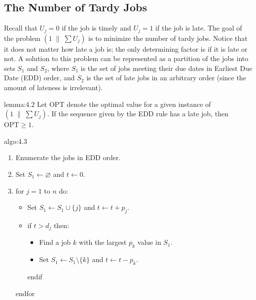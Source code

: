 
\subsection{The Number of Tardy Jobs} \label{subsec:4.2}
Recall that $U_j = 0$ if the job is timely and $U_j = 1$ if the job is late. 
The goal of the problem $(1\;\|\;\sum U_j)$ is to minimize the number of 
tardy jobs. Notice that it does not matter how late a job is; the only 
determining factor is if it is late or not. A solution to this problem can 
be represented as a partition of the jobs into sets $S_1$ and $S_2$, where 
$S_1$ is the set of jobs meeting their due dates in Earliest Due Date (EDD)
order, and $S_2$ is the set of late jobs in an arbitrary order (since the 
amount of lateness is irrelevant).  

\begin{lemma}{lemma:4.2}
    Let OPT denote the optimal value for a given instance of $(1\;\|\;\sum U_j)$.
    If the sequence given by the EDD rule has a late job, then $\text{OPT} \geq 1$. 
\end{lemma}
\begin{pf}
\end{pf}

\begin{algo}{algo:4.3}
    \begin{enumerate}
        \item Enumerate the jobs in EDD order. 
        \item Set $S_1 \gets \varnothing$ and $t \gets 0$. 
        \item for $j=1$ to $n$ do: 
        \begin{itemize}[\label{}]
            \item Set $S_1 \gets S_1 \cup \{j\}$ and $t \gets t + p_j$. 
            \item if $t > d_j$ then: 
            \begin{itemize}[\label{}]
                \item Find a job $k$ with the largest $p_k$ value in $S_1$. 
                \item Set $S_1 \gets S_1 \setminus \{k\}$ and $t \gets t - p_k$. 
            \end{itemize}
            endif
        \end{itemize}
        endfor
    \end{enumerate}
\end{algo}

